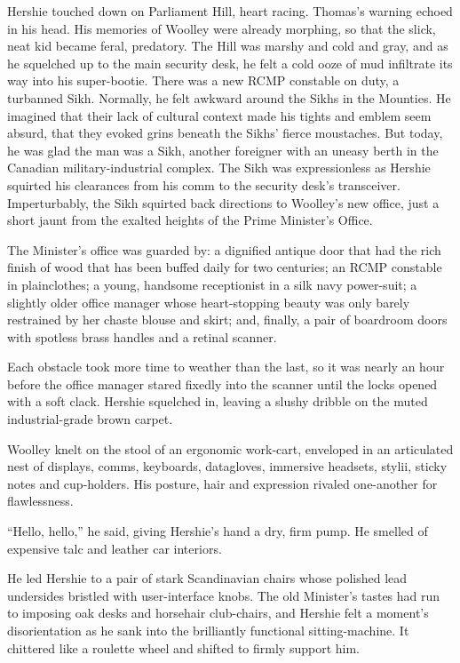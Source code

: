 \tb

Hershie touched down on Parliament Hill, heart racing. Thomas's
warning echoed in his head. His memories of Woolley were already
morphing, so that the slick, neat kid became feral, predatory. The
Hill was marshy and cold and gray, and as he squelched up to the
main security desk, he felt a cold ooze of mud infiltrate its way
into his super-bootie. There was a new RCMP constable on duty, a
turbanned Sikh. Normally, he felt awkward around the Sikhs in the
Mounties. He imagined that their lack of cultural context made his
tights and emblem seem absurd, that they evoked grins beneath the
Sikhs' fierce moustaches. But today, he was glad the man was a
Sikh, another foreigner with an uneasy berth in the Canadian
military-industrial complex. The Sikh was expressionless as Hershie
squirted his clearances from his comm to the security desk's
transceiver. Imperturbably, the Sikh squirted back directions to
Woolley's new office, just a short jaunt from the exalted heights
of the Prime Minister's Office.

The Minister's office was guarded by: a dignified antique door that
had the rich finish of wood that has been buffed daily for two
centuries; an RCMP constable in plainclothes; a young, handsome
receptionist in a silk navy power-suit; a slightly older office
manager whose heart-stopping beauty was only barely restrained by
her chaste blouse and skirt; and, finally, a pair of boardroom
doors with spotless brass handles and a retinal scanner.

Each obstacle took more time to weather than the last, so it was
nearly an hour before the office manager stared fixedly into the
scanner until the locks opened with a soft clack. Hershie squelched
in, leaving a slushy dribble on the muted industrial-grade brown
carpet.

Woolley knelt on the stool of an ergonomic work-cart, enveloped in
an articulated nest of displays, comms, keyboards, datagloves,
immersive headsets, stylii, sticky notes and cup-holders. His
posture, hair and expression rivaled one-another for flawlessness.

``Hello, hello,'' he said, giving Hershie's hand a dry, firm pump.
He smelled of expensive talc and leather car interiors.

He led Hershie to a pair of stark Scandinavian chairs whose
polished lead undersides bristled with user-interface knobs. The
old Minister's tastes had run to imposing oak desks and horsehair
club-chairs, and Hershie felt a moment's disorientation as he sank
into the brilliantly functional sitting-machine. It chittered like
a roulette wheel and shifted to firmly support him.

